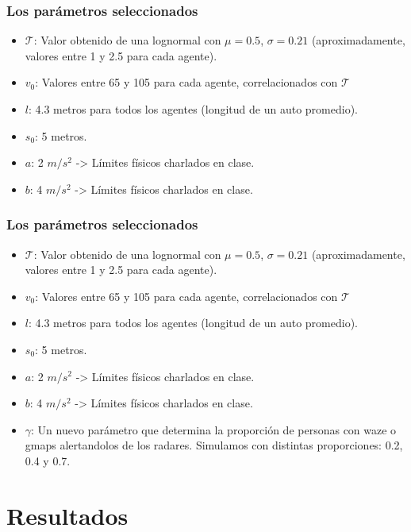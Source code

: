 \documentclass[10pt, compress]{beamer}
\begin{document}
\begin{frame}[fragile]
\frametitle{Los par\'ametros seleccionados}

\begin{itemize}

\item $\mathcal{T}$: Valor obtenido de una lognormal con $\mu = 0.5$, $\sigma = 0.21$ (aproximadamente, valores entre 1 y 2.5 para cada agente).
\item $v_0$: Valores entre 65 y 105 para cada agente, correlacionados con $\mathcal{T}$
\item $l$: 4.3 metros para todos los agentes (longitud de un auto promedio).
\item $s_0$: 5 metros.
\item $a$: 2 $m/s^2$ -> Límites físicos charlados en clase.
\item $b$: 4 $m/s^2$ -> Límites físicos charlados en clase.

\end{itemize}

\end{frame}

\begin{frame}[fragile]
\frametitle{Los par\'ametros seleccionados}

\begin{itemize}

\item $\mathcal{T}$: Valor obtenido de una lognormal con $\mu = 0.5$, $\sigma = 0.21$ (aproximadamente, valores entre 1 y 2.5 para cada agente).
\item $v_0$: Valores entre 65 y 105 para cada agente, correlacionados con $\mathcal{T}$
\item $l$: 4.3 metros para todos los agentes (longitud de un auto promedio).
\item $s_0$: 5 metros.
\item $a$: 2 $m/s^2$ -> Límites físicos charlados en clase.
\item $b$: 4 $m/s^2$ -> Límites físicos charlados en clase.
\item $\gamma$: Un nuevo par\'ametro que determina la proporci\'on de personas con waze o gmaps alertandolos de los radares. Simulamos con distintas proporciones: 0.2, 0.4 y 0.7.

\end{itemize}

\end{frame}

\section{Resultados}
\end{document}
